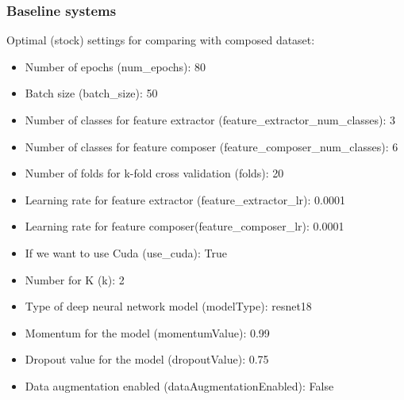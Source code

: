 \subsubsection{Baseline systems}
Optimal (stock) settings for comparing with composed dataset:
\begin{itemize}
    \item Number of epochs (num{\_}epochs): 80
    \item Batch size (batch{\_}size): 50
    \item Number of classes for feature extractor (feature{\_}extractor{\_}num{\_}classes): 3
    \item Number of classes for feature composer (feature{\_}composer{\_}num{\_}classes): 6
    \item Number of folds for k-fold cross validation (folds): 20
    \item Learning rate for feature extractor (feature{\_}extractor{\_}lr): 0.0001
    \item Learning rate for feature composer(feature{\_}composer{\_}lr): 0.0001
    \item If we want to use Cuda (use{\_}cuda): True
    \item Number for K (k): 2
    \item Type of deep neural network model (modelType): resnet18
    \item Momentum for the model (momentumValue): 0.99
    \item Dropout value for the model (dropoutValue): 0.75
    \item Data augmentation enabled (dataAugmentationEnabled): False
\end{itemize}